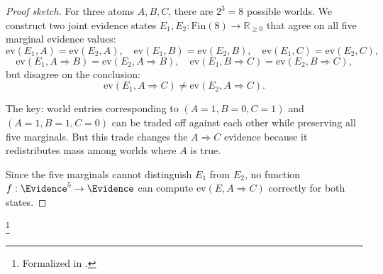 \documentclass[11pt,openany]{report}
\begin{document}
\begin{proof}[Proof sketch]
For three atoms $A, B, C$, there are $2^3 = 8$ possible worlds.
We construct two joint evidence states $E_1, E_2 :
\mathrm{Fin}(8) \to \mathbb{R}_{\ge 0}$ that agree on all five
marginal evidence values:
\[
  \mathrm{ev}(E_1, A) = \mathrm{ev}(E_2, A), \quad
  \mathrm{ev}(E_1, B) = \mathrm{ev}(E_2, B), \quad
  \mathrm{ev}(E_1, C) = \mathrm{ev}(E_2, C),
\]
\[
  \mathrm{ev}(E_1, A \!\Rightarrow\! B) = \mathrm{ev}(E_2, A \!\Rightarrow\! B), \quad
  \mathrm{ev}(E_1, B \!\Rightarrow\! C) = \mathrm{ev}(E_2, B \!\Rightarrow\! C),
\]
but disagree on the conclusion:
\[
  \mathrm{ev}(E_1, A \!\Rightarrow\! C) \ne \mathrm{ev}(E_2, A \!\Rightarrow\! C).
\]

The key: world entries corresponding to $(A\!=\!1, B\!=\!0, C\!=\!1)$
and $(A\!=\!1, B\!=\!1, C\!=\!0)$ can be traded off against each other
while preserving all five marginals.  But this trade changes the
$A \Rightarrow C$ evidence because it redistributes mass among worlds
where $A$ is true.

Since the five marginals cannot distinguish $E_1$ from $E_2$, no
function $f : \Evidence^5 \to \Evidence$ can compute $\mathrm{ev}(E, A \!\Rightarrow\! C)$
correctly for both states.
\end{proof}%
\footnote{Formalized in .}
\end{document}
